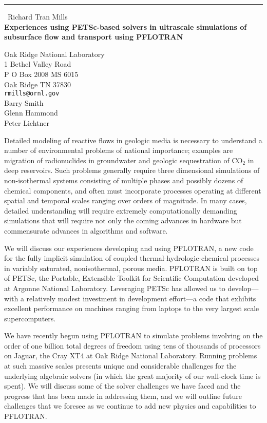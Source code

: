 \documentclass{report}
\begin{document}
\begin{center}
\rule{6in}{1pt} \
{\large Richard Tran Mills \\
{\bf Experiences using PETSc-based solvers in ultrascale simulations of subsurface flow and transport using PFLOTRAN}}

Oak Ridge National Laboratory \\ 1 Bethel Valley Road \\ P O Box 2008 MS 6015 \\ Oak Ridge TN 37830
\\
{\tt rmills@ornl.gov}\\
Barry Smith\\
Glenn Hammond\\
	Peter Lichtner\end{center}

Detailed modeling of reactive flows in geologic media is necessary to
understand a number of environmental problems of national importance;
examples are migration of radionuclides in groundwater and geologic
sequestration of CO$_2$ in deep reservoirs. Such problems generally
require three dimensional simulations of non-isothermal systems
consisting of multiple phases and possibly dozens of chemical components,
and often must incorporate processes operating at different spatial and
temporal scales ranging over orders of magnitude. In many cases, detailed
understanding
will require extremely computationally demanding simulations that will
require not only the coming advances in hardware but commensurate
advances in algorithms and software.

We will discuss our experiences developing and using PFLOTRAN, a new code
for the fully implicit simulation of coupled thermal-hydrologic-chemical
processes in variably saturated, nonisothermal, porous media. PFLOTRAN is
built on top of PETSc, the Portable, Extensible Toolkit for Scientific
Computation developed at Argonne National Laboratory. Leveraging PETSc
has allowed us to develop---with a relatively modest investment in
development effort---a code that exhibits excellent performance on
machines ranging from laptops to the very largest scale supercomputers.

We have recently begun using PFLOTRAN to simulate problems involving on
the order of one billion total degrees of freedom using tens of thousands
of processors on Jaguar, the Cray XT4 at Oak Ridge National Laboratory.
Running problems at such massive scales presents unique and considerable
challenges for the underlying algebraic solvers (in which the great
majority of our wall-clock time is spent). We will discuss some of the
solver challenges we have faced and the progress that has been made in
addressing them, and we will outline future challenges
that we foresee as we continue to add new physics and capabilities to PFLOTRAN.
\end{document}

